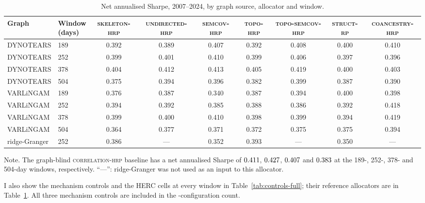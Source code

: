 \documentclass[11pt, a4paper]{report}
\newcommand{\corrhrp}{\textsc{correlation-hrp}}
\newcommand{\skelhrp}{\textsc{skeleton-hrp}}
\newcommand{\undirhrp}{\textsc{undirected-hrp}}
\newcommand{\semcovhrp}{\textsc{semcov-hrp}}
\newcommand{\topohrp}{\textsc{topo-hrp}}
\newcommand{\toposemcovhrp}{\textsc{topo-semcov-hrp}}
\newcommand{\structrp}{\textsc{struct-rp}}
\newcommand{\coanchrp}{\textsc{coancestry-hrp}}
\newcommand{\floatnote}[1]{\par\vspace{3pt}\begin{minipage}{0.92\textwidth}\footnotesize Note. #1\end{minipage}\par}
\begin{document}
\begin{table}
  \centering
  \caption{Net annualised Sharpe, 2007--2024, by graph source, allocator and window.}
  \vspace{0.5em}
  \label{tab:matrix-full}
  \begin{tabular}{l l c c c c c c c}
    \toprule
    Graph & \shortstack{Window\\(days)} & \skelhrp{} & \undirhrp{} & \semcovhrp{} & \topohrp{} & \toposemcovhrp{} & \structrp{} & \coanchrp{} \\
    \midrule
    DYNOTEARS & 189 & 0.392 & 0.389 & 0.407 & 0.392 & 0.408 & 0.400 & 0.410 \\
    DYNOTEARS & 252 & 0.399 & 0.401 & 0.410 & 0.399 & 0.406 & 0.397 & 0.396 \\
    DYNOTEARS & 378 & 0.404 & 0.412 & 0.413 & 0.405 & 0.419 & 0.400 & 0.403 \\
    DYNOTEARS & 504 & 0.375 & 0.394 & 0.396 & 0.382 & 0.399 & 0.387 & 0.390 \\
    VARLiNGAM & 189 & 0.376 & 0.387 & 0.340 & 0.387 & 0.394 & 0.400 & 0.398 \\
    VARLiNGAM & 252 & 0.394 & 0.392 & 0.385 & 0.388 & 0.386 & 0.392 & 0.418 \\
    VARLiNGAM & 378 & 0.399 & 0.400 & 0.410 & 0.398 & 0.399 & 0.394 & 0.419 \\
    VARLiNGAM & 504 & 0.364 & 0.377 & 0.371 & 0.372 & 0.375 & 0.375 & 0.394 \\
    ridge-Granger   & 252 & 0.386 & --- & 0.352 & 0.393 & --- & 0.350 & --- \\
    \bottomrule
  \end{tabular}
  \floatnote{The graph-blind \corrhrp{} baseline has a net annualised Sharpe of $0.411$, $0.427$, $0.407$ and $0.383$ at the 189-, 252-, 378- and 504-day windows, respectively. ``---'': ridge-Granger was not used as an input to this allocator.}
\end{table}

I also show the mechanism controls and the
HERC cells at every window in Table~\ref{tab:controls-full}; their reference allocators are in Table~\ref{tab:matrix-full}.
All three mechanism controls are included in the \rsNtrials-configuration count.
\end{document}
